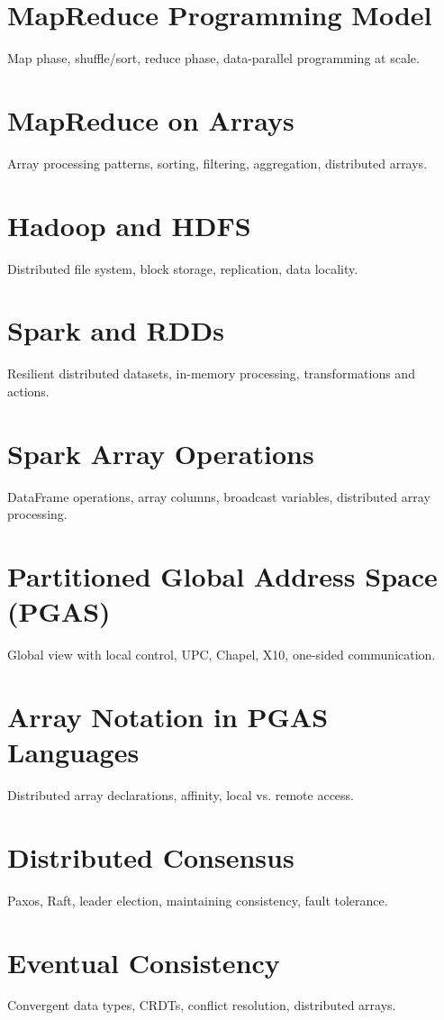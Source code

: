 \chapter{MapReduce Programming Model}
Map phase, shuffle/sort, reduce phase, data-parallel programming at scale.

\chapter{MapReduce on Arrays}
Array processing patterns, sorting, filtering, aggregation, distributed arrays.

\chapter{Hadoop and HDFS}
Distributed file system, block storage, replication, data locality.

\chapter{Spark and RDDs}
Resilient distributed datasets, in-memory processing, transformations and actions.

\chapter{Spark Array Operations}
DataFrame operations, array columns, broadcast variables, distributed array processing.

\chapter{Partitioned Global Address Space (PGAS)}
Global view with local control, UPC, Chapel, X10, one-sided communication.

\chapter{Array Notation in PGAS Languages}
Distributed array declarations, affinity, local vs. remote access.

\chapter{Distributed Consensus}
Paxos, Raft, leader election, maintaining consistency, fault tolerance.

\chapter{Eventual Consistency}
Convergent data types, CRDTs, conflict resolution, distributed arrays.

